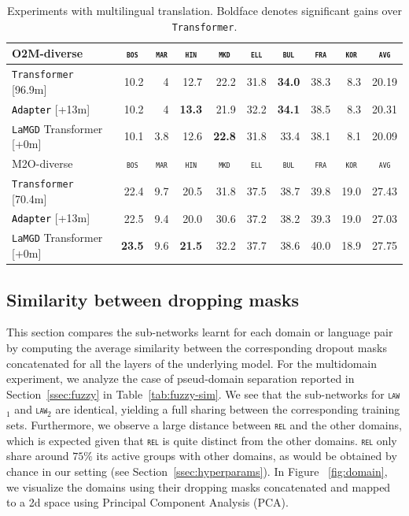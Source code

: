 \documentclass[11pt]{article}
\newcommand{\fyDone}[1]{\done[FY]\Todo[FY:]{\textcolor{orange}{#1}}}
\newcommand{\revision}[1]{\textcolor{black}{#1}}
\newcommand{\domain}[1]{\texttt{\textsc{#1}}}
\newcommand{\system}[1]{\texttt{{#1}}}
\newcommand{\SB}[1]{\textbf{#1}}
\begin{document}
\begin{table}[h!]
\begin{tabular}{|p{4cm}|*{9}{r|}}
    \hline
    \hline
    O2M-diverse & \multicolumn{1}{c|}{\domain{bos}} & \multicolumn{1}{c|}{\domain{mar}} & \multicolumn{1}{c|}{\domain{hin}} & \multicolumn{1}{c|}{\domain{mkd}} & \multicolumn{1}{c|}{\domain{ell}} & \multicolumn{1}{c|}{\domain{bul}} & \multicolumn{1}{c|}{\domain{fra}} & \multicolumn{1}{c|}{\domain{kor}} & \multicolumn{1}{c|}{\domain{avg}} \\ \hline 
    \system{Transformer}  \hfill{\footnotesize[96.9m]} & 10.2&4&12.7&22.2&31.8&\SB{34.0}&38.3&8.3&20.19 \\
    \revision{\system{Adapter}}   \hfill{\footnotesize[+13m]}  &10.2&4&\SB{13.3}&21.9&32.2&\SB{34.1}&38.5&8.3&20.31 \\ 
    \system{LaMGD} Transformer   \hfill{\footnotesize[+0m]}&10.1&3.8&12.6&\SB{22.8}&31.8&33.4&38.1&8.1&20.09\\
    \hline 
    \hline
    M2O-diverse & \multicolumn{1}{c|}{\domain{bos}} & \multicolumn{1}{c|}{\domain{mar}} & \multicolumn{1}{c|}{\domain{hin}} & \multicolumn{1}{c|}{\domain{mkd}} & \multicolumn{1}{c|}{\domain{ell}} & \multicolumn{1}{c|}{\domain{bul}} & \multicolumn{1}{c|}{\domain{fra}} & \multicolumn{1}{c|}{\domain{kor}} & \multicolumn{1}{c|}{\domain{avg}} \\ \hline 
    \system{Transformer}  \hfill{\footnotesize[70.4m]} &22.4&9.7&20.5&31.8&37.5&38.7&39.8&19.0&27.43 \\
    \revision{\system{Adapter}}   \hfill{\footnotesize[+13m]}  &22.5&9.4&20.0&30.6&37.2&38.2&39.3&19.0&27.03\\ 
    \system{LaMGD} Transformer  \hfill{\footnotesize[+0m]} &\SB{23.5}&9.6&\SB{21.5}&32.2&37.7&38.6&40.0&18.9&27.75 \\
    \hline
  \end{tabular}
  \caption{Experiments with multilingual translation. Boldface denotes significant gains over \system{Transformer}.\fyDone{What is the bold for ?}}
  \label{tab:multilingual}
\end{table}

\subsection{Similarity between dropping masks}
\label{ssec:abalation}
This section compares the sub-networks learnt for each domain or language pair by computing the average similarity between the corresponding dropout masks concatenated for all the layers of the underlying model. For the multidomain experiment, we analyze the case of pseud-domain separation reported in Section~\ref{ssec:fuzzy} in Table~\ref{tab:fuzzy-sim}. We see that the sub-networks for \domain{law$_1$} and \domain{law$_2$} are identical, yielding a full sharing between the corresponding training sets. Furthermore, we observe a large distance between \domain{rel} and the other domains, which is expected given that \domain{rel} is quite distinct from the other domains. \domain{rel} only share around $75 \%$ its active groups with other domains, as would be obtained by chance in our setting (see Section~\ref{ssec:hyperparams}). In Figure ~\ref{fig:domain}, we visualize the domains using their dropping masks concatenated and mapped to a 2d space using Principal Component Analysis (PCA).
\end{document}
